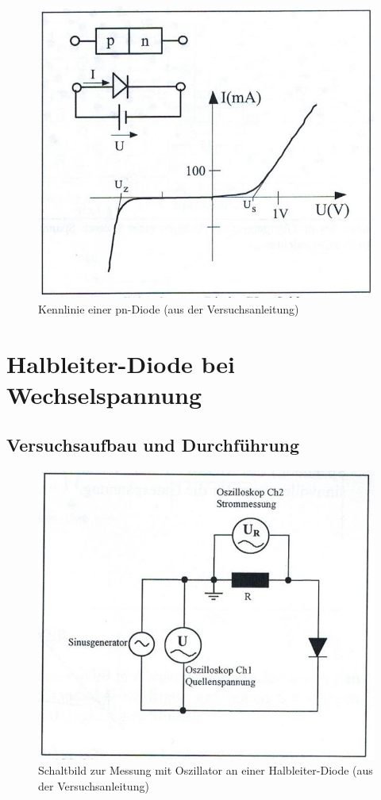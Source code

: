 \documentclass{scrartcl}
\begin{document}
\begin{figure}[H]
  \centering
    \includegraphics[scale=0.75]{Kennlinie_Diode.JPG}
  \caption{Kennlinie einer pn-Diode (aus der Versuchsanleitung)}
  \label{fig:Kennlinie_Diode}
\end{figure}




\pagebreak
\section{Halbleiter-Diode bei Wechselspannung}
\subsection{Versuchsaufbau und Durchführung}

\begin{figure}[H]
  \centering
    \includegraphics[scale=0.75]{Aufbau3.JPG}
  \caption{Schaltbild zur Messung mit Oszillator an einer Halbleiter-Diode (aus der Versuchsanleitung)}
  \label{fig:Aufbau3}
\end{figure}
\end{document}
